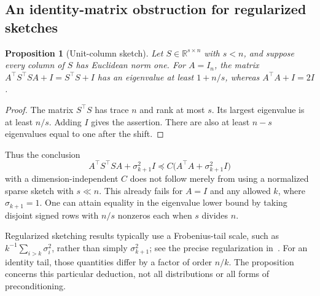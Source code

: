 \documentclass[11pt,a4paper]{article}
\newcommand{\R}{\mathbb R}
\newtheorem{proposition}[theorem]{Proposition}
\theoremstyle{definition}
\theoremstyle{remark}
\begin{document}
\subsection{An identity-matrix obstruction for regularized sketches}
\begin{proposition}[Unit-column sketch]
\label{prop:sketch}
Let $S\in\R^{s\times n}$ with $s<n$, and suppose every column of $S$ has Euclidean norm one. For $A=I_n$, the matrix
$A^\top S^\top SA+I=S^\top S+I$ has an eigenvalue at least $1+n/s$, whereas $A^\top A+I=2I$.
\end{proposition}
\begin{proof}
The matrix $S^\top S$ has trace $n$ and rank at most $s$. Its largest eigenvalue is at least $n/s$. Adding $I$ gives the assertion. There are also at least $n-s$ eigenvalues equal to one after the shift.
\end{proof}

Thus the conclusion
\[
 A^\top S^\top SA+\sigma_{k+1}^2I
 \preceq C\bigl(A^\top A+\sigma_{k+1}^2I\bigr)
\]
with a dimension-independent $C$ does not follow merely from using a normalized sparse sketch with $s\ll n$. This already fails for $A=I$ and any allowed $k$, where $\sigma_{k+1}=1$. One can attain equality in the eigenvalue lower bound by taking disjoint signed rows with $n/s$ nonzeros each when $s$ divides $n$.

Regularized sketching results typically use a Frobenius-tail scale, such as
$k^{-1}\sum_{i>k}\sigma_i^2$, rather than simply $\sigma_{k+1}^2$; see the precise regularization in~\cite[Corollary 13]{ds}. For an identity tail, those quantities differ by a factor of order $n/k$. The proposition concerns this particular deduction, not all distributions or all forms of preconditioning.
\end{document}
